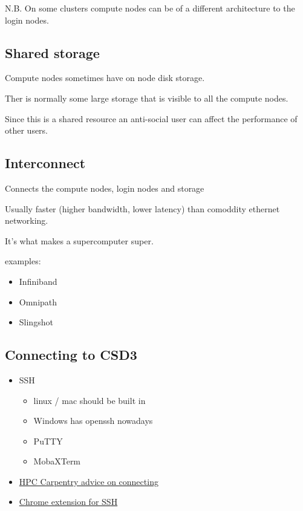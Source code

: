 \documentclass[
  letterpaper,
  DIV=11,
  numbers=noendperiod]{scrartcl}
\providecommand{\tightlist}{%
  \setlength{\itemsep}{0pt}\setlength{\parskip}{0pt}}
\begin{document}
N.B. On some clusters compute nodes can be of a different architecture
to the login nodes.

\subsection{Shared storage}\label{shared-storage}

Compute nodes sometimes have on node disk storage.

Ther is normally some large storage that is visible to all the compute
nodes.

Since this is a shared resource an anti-social user can affect the
performance of other users.

\subsection{Interconnect}\label{interconnect}

Connects the compute nodes, login nodes and storage

Usually faster (higher bandwidth, lower latency) than comoddity ethernet
networking.

It's what makes a supercomputer super.

examples:

\begin{itemize}
\tightlist
\item
  Infiniband
\item
  Omnipath
\item
  Slingshot
\end{itemize}

\subsection{Connecting to CSD3}\label{connecting-to-csd3}

\begin{itemize}
\tightlist
\item
  SSH

  \begin{itemize}
  \tightlist
  \item
    linux / mac should be built in
  \item
    Windows has openssh nowadays
  \item
    PuTTY
  \item
    MobaXTerm
  \end{itemize}
\item
  \href{https://carpentries-incubator.github.io/hpc-intro/11-connecting/index.html}{HPC
  Carpentry advice on connecting}
\item
  \href{https://chrome.google.com/webstore/detail/iodihamcpbpeioajjeobimgagajmlibd}{Chrome
  extension for SSH}
\end{itemize}
\end{document}
